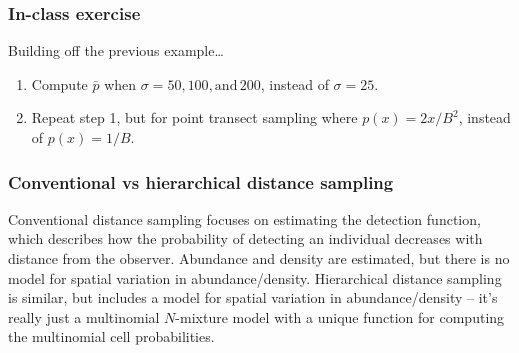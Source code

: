 \documentclass[color=usenames,dvipsnames]{beamer}\usepackage[]{graphicx}\usepackage[]{color}
\begin{document}
\begin{frame}
  \frametitle{In-class exercise}
  Building off the previous example\dots
  \begin{enumerate}
    \item Compute $\bar{p}$ when $\sigma=50, 100, \mathrm{and}\, 200$, instead of
      $\sigma=25$. 
    \item Repeat step 1, but for point transect sampling where
      $p(x)=2x/B^2$, instead of $p(x)=1/B$. 
  \end{enumerate}
\end{frame}




\begin{frame}
  \frametitle{Conventional vs hierarchical distance sampling}
  \alert{Conventional} distance sampling focuses on estimating the
  detection function, which describes how the probability of detecting
  an individual decreases with distance from the observer. Abundance
  and density are estimated, but there is no model for
  spatial variation in abundance/density.
  \pause
  \vfill
  \alert{Hierarchical} distance sampling is similar, but includes a
  model for spatial variation in abundance/density -- it's really just
  a multinomial $N$-mixture model with a unique function for computing
  the multinomial cell probabilities.
\end{frame}
\end{document}
